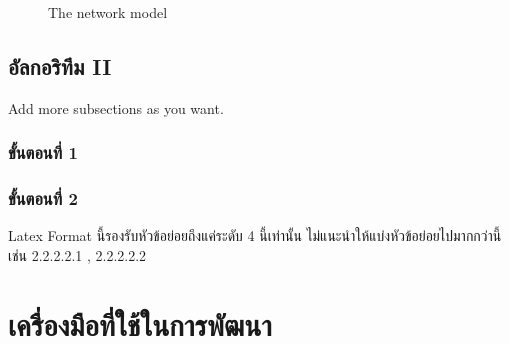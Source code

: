 \begin{figure}[!h]\centering
    \setlength{\fboxrule}{0.2mm} %
    \setlength{\fboxsep}{1cm}
    \caption{The network model}\label{fig:model2}
\end{figure}


\subsection{อัลกอริทึม II}
Add more subsections as you want.
\subsubsection{ขั้นตอนที่ 1}
\subsubsection{ขั้นตอนที่ 2}
Latex Format นี้รองรับหัวข้อย่อยถึงแค่ระดับ 4 นี้เท่านั้น ไม่แนะนำให้แบ่งหัวข้อย่อยไปมากกว่านี้ เช่น 2.2.2.2.1 , 2.2.2.2.2

\section{เครื่องมือที่ใช้ในการพัฒนา}